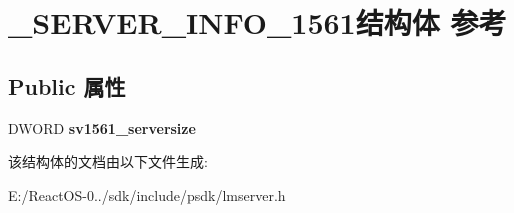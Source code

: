 \hypertarget{struct___s_e_r_v_e_r___i_n_f_o__1561}{}\section{\+\_\+\+S\+E\+R\+V\+E\+R\+\_\+\+I\+N\+F\+O\+\_\+1561结构体 参考}
\label{struct___s_e_r_v_e_r___i_n_f_o__1561}
\subsection*{Public 属性}
\begin{DoxyCompactItemize}
\item 
\mbox{\label{struct___s_e_r_v_e_r___i_n_f_o__1561_a3b6f48f55084c073a1480d6f3ffa4e8e}} 
D\+W\+O\+RD {\bfseries sv1561\+\_\+serversize}
\end{DoxyCompactItemize}


该结构体的文档由以下文件生成\+:\begin{DoxyCompactItemize}
\item 
E\+:/\+React\+O\+S-\/0../sdk/include/psdk/lmserver.\+h\end{DoxyCompactItemize}
